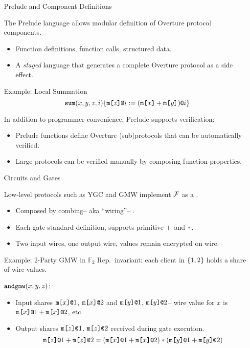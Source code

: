\documentclass{beamer}
\begin{document}
\begin{frame}{Prelude and Component Definitions}

  The Prelude language allows modular definition of Overture protocol components.
  \begin{itemize}
  \item Function definitions, function calls, structured data.
  \item A \emph{staged} language that generates a complete Overture protocol
    as a side effect.
  \end{itemize}
  
  \begin{exampleblock}{Example: Local Summation}
    $$
    \texttt{sum}(x,y,z,i) \{ \texttt{m[}z\texttt{]}\texttt{@}i := (\texttt{m[}x\texttt{]} + \texttt{m[}y\texttt{]})\texttt{@}i \} 
    $$
  \end{exampleblock}

  In addition to programmer convenience, Prelude supports verification:
  \begin{itemize}
  \item Prelude functions define Overture (sub)protocols that can be automatically verified.
  \item Large protocols can be verified manually by composing function properties. 
  \end{itemize}

\end{frame}

\begin{frame}{Circuits and Gates}

  Low-level protocols such as YGC and GMW implement $\mathcal{F}$ as a .
  \begin{itemize}
  \item Composed by combing-- aka ``wiring''-- .
  \item Each gate standard definition, supports primitive $+$ and $*$.
  \item Two input wires, one output wire, values remain encrypted on wire. 
  \end{itemize}

  \begin{exampleblock}{Example: 2-Party GMW in $\mathbb{F}_2$}
    Rep.~invariant: each client in $\{ 1,2 \}$ holds a share of wire values.

    \medskip
  
    $\texttt{andgmw}(x,y,z)$:
    
    \begin{itemize}
    \item Input shares $\texttt{m[}x\texttt{]}\texttt{@}1$, $\texttt{m[}x\texttt{]}\texttt{@}2$ and $\texttt{m[}y\texttt{]}\texttt{@}1$, $\texttt{m[}y\texttt{]}\texttt{@}2$--
      wire value for $x$ is $\texttt{m[}x\texttt{]}\texttt{@}1 + \texttt{m[}x\texttt{]}\texttt{@}2$, etc.
    \item Output shares $\texttt{m[}z\texttt{]}\texttt{@}1$, $\texttt{m[}z\texttt{]}\texttt{@}2$ received during gate execution.
      $$
      \texttt{m[}z\texttt{]}\texttt{@}1 + \texttt{m[}z\texttt{]}\texttt{@}2 = (\texttt{m[}x\texttt{]}\texttt{@}1 + \texttt{m[}x\texttt{]}\texttt{@}2) * (\texttt{m[}y\texttt{]}\texttt{@}1 + \texttt{m[}y\texttt{]}\texttt{@}2)
      $$
    \end{itemize}

  \end{exampleblock}

\end{frame}
\end{document}

